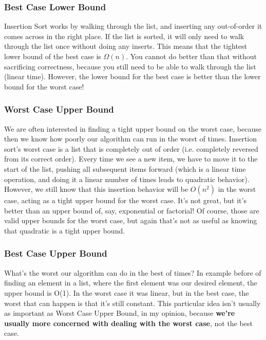 \documentclass[en,hazy,blue,screen,14pt]{elegantnote}
\begin{document}
\subsubsection*{Best Case Lower Bound}

Insertion Sort works by walking through the list, and inserting any
out-of-order it comes across in the right place. If the list is sorted,
it will only need to walk through the list once without doing any
inserts. This means that the tightest lower bound of the best case
is $\Omega(n)$. You cannot do better than that without sacrificing
correctness, because you still need to be able to walk through the
list (linear time). However, the lower bound for the best case is
better than the lower bound for the worst case!

\subsubsection*{Worst Case Upper Bound}

We are often interested in finding a tight upper bound on the worst
case, because then we know how poorly our algorithm can run in the
worst of times. Insertion sort's worst case is a list that is completely
out of order (i.e. completely reversed from its correct order). Every
time we see a new item, we have to move it to the start of the list,
pushing all subsequent items forward (which is a linear time operation,
and doing it a linear number of times leads to quadratic behavior).
However, we still know that this insertion behavior will be $O(n^{2})$
in the worst case, acting as a tight upper bound for the worst case.
It's not great, but it's better than an upper bound of, say, exponential
or factorial! Of course, those are valid upper bounds for the worst
case, but again that's not as useful as knowing that quadratic is
a tight upper bound.

\subsubsection*{Best Case Upper Bound}

What's the worst our algorithm can do in the best of times? In example
before of finding an element in a list, where the first element was
our desired element, the upper bound is O(1). In the worst case it
was linear, but in the best case, the worst that can happen is that
it's still constant. This particular idea isn't usually as important
as Worst Case Upper Bound, in my opinion, because \textbf{we're usually
more concerned with dealing with the worst case}, not the best case.
\end{document}
